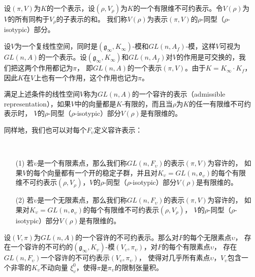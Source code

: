   \begin{definition}
  设$(\pi, V)$为$K$的一个表示，设$(\rho,
  V_{\rho})$为$K$的一个有限维不可约表示。令$V(\rho)$为$V$的所有同构于$V_{\rho}$的子表示的和。
  我们称$V(\rho)$为表示$(\pi, V)$的$\rho$-同型（$\rho$-isotypic）部分。
  \end{definition}

  设$V$为一个复线性空间，同时是$(\mathfrak{g}_{\infty},
  K_{\infty})$-模和$GL(n,A_f)$-模，这样$V$可视为$GL(n,A)$的一个表示。设$(\mathfrak{g}_{\infty},
  K_{\infty})$和$GL(n,A_f)$对$V$的作用是可交换的，我们把这两个作用都记为$\pi$，
  即$GL(n,A)$的一个表示$(\pi,V)$。由于$K = K_{\infty}\cdot
  K_f$，因此$K$在$V$上也有一个作用，这个作用也记为$\pi$。

  \begin{definition}
  满足上述条件的线性空间$V$称为$GL(n,A)$的一个容许的表示（admissible
  representation），如果$V$中的向量都是$K$-有限的，而且当$\rho$为$K$的任一有限维不可约表示时，
  $V$的$\rho$-同型（$\rho$-isotypic）部分$V(\rho)$是有限维的。
  \end{definition}

  同样地，我们也可以对每个$F_{\upsilon}$定义容许表示：

  \begin{definition}\
  \begin{enumerate}
  \item[(1)]
  若$\upsilon$是一个有限素点，那么我们称$GL(n,F_{\upsilon})$的表示$(\pi,V)$为容许的，
  如果$V$的每个向量都有一个开的稳定子群，并且对$K_{\upsilon} =
  GL(n,\mathfrak{o}_{\upsilon})$的每个有限维不可约表示$(\rho,V_{\rho})$，$V$的$\rho$-同型（$\rho$-isotypic）部分$V(\rho)$是有限维的。
  \item[(2)]
  若$\upsilon$是一个无限素点，那么我们称$GL(n,F_{\upsilon})$的表示$(\pi,V)$为容许的，
  如果对$K_{\upsilon} =  GL(n,\mathfrak{o}_{\upsilon})$的每个有限维不可约表示$(\rho,V_{\rho})$，
  $V$的$\rho$-同型（$\rho$-isotypic）部分$V(\rho)$是有限维的。
  \end{enumerate}
  \end{definition}

  \begin{theorem}
  \label{thm1}
  设$(V,\pi)$为$GL(n,A)$的一个容许的不可约表示。那么对$F$的每个无限素点$\upsilon$，
  存在一个容许的不可约的$(\mathfrak{g_{\infty}},
  K_{\upsilon})$-模$(V_{\upsilon},\pi_{\upsilon})$，对$F$的每个有限素点$\upsilon$，
  存在$GL(n,F_{\upsilon})$一个容许的不可约表示$(V_{\upsilon},\pi_{\upsilon})$，
  使得对几乎所有素点$\upsilon$，$V_{\upsilon}$包含一个非零的$K_{\upsilon}$不动向量
  $\xi_{\upsilon}^0$，使得$\pi$是$\pi_{\upsilon}$的限制张量积。
  \end{theorem}


